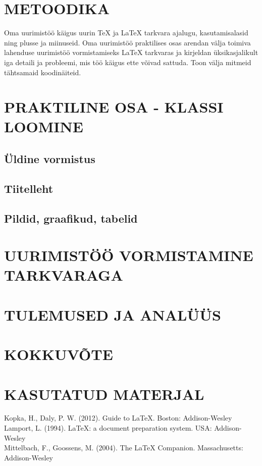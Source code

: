 \documentclass{21kuur}
\begin{document}
\chapter{METOODIKA}
Oma uurimistöö käigus uurin TeX ja LaTeX tarkvara ajalugu, kasutamisalasid ning plusse ja miinuseid. Oma uurimistöö praktilises osas arendan välja toimiva lahenduse uurimistöö vormistamiseks LaTeX tarkvaras ja kirjeldan üksikasjalikult iga detaili ja probleemi, mis töö käigus ette võivad sattuda. Toon välja mitmeid tähtsamaid koodinäiteid.

\chapter{PRAKTILINE OSA - KLASSI LOOMINE}
\section{Üldine vormistus}
\section{Tiitelleht}
\section{Pildid, graafikud, tabelid}

\chapter{UURIMISTÖÖ VORMISTAMINE \latex TARKVARAGA}

\chapter{TULEMUSED JA ANALÜÜS}
\newpage
\chapter*{KOKKUVÕTE}
\newpage
\chapter*{KASUTATUD MATERJAL}
Kopka, H., Daly, P. W. (2012). Guide to LaTeX. Boston: Addison-Wesley
\\Lamport, L. (1994). LaTeX: a document preparation system. USA: Addison-Wesley
\\Mittelbach, F., Goossens, M. (2004). The LaTeX Companion. Massachusetts: Addison-Wesley
\end{document}
